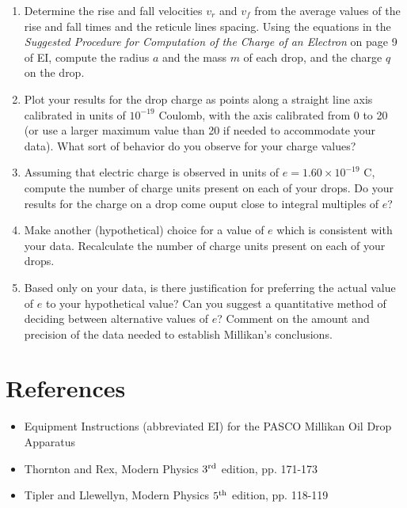 \begin{enumerate}
\item Determine the rise and fall velocities
$v_r$ and $v_f$ from the average values of the
rise and fall times and the reticule lines spacing. Using the equations
in the {\em Suggested Procedure for Computation of
the Charge of an Electron} on page 9 of EI,
compute the radius $a$ and the mass $m$ of each drop, and the charge $q$ on
the drop. 


\item Plot your results for the drop charge as points along a
straight line axis calibrated in units of
$10^{-19}$ Coulomb, with the axis
calibrated from 0 to 20 (or use a larger maximum value than 20 if
needed to accommodate your data).  What sort of behavior do you
observe for your charge values?

\item Assuming that electric charge is observed in units of $e =
1.60 \times 10^{-19}$ C, compute the
number of charge units present on each of your drops.  Do your results
for the charge on a drop come ouput close to integral multiples of $e$?

\item Make another (hypothetical) choice for a value of $e$ which is
consistent with your data.  Recalculate the number of charge units
present on each of your drops.

\item Based only on your data, is there justification for preferring the
actual value of $e$ to your hypothetical value?  Can you suggest a quantitative method of deciding
between alternative values of $e$?  Comment on the amount and precision
of the data needed to establish Millikan's
conclusions.
\end{enumerate}

\section{References}

\begin{itemize}
\item Equipment Instructions (abbreviated EI) for the PASCO Millikan Oil Drop Apparatus
\item Thornton and Rex, Modern Physics $3^{\rm rd}$ edition, pp. 171-173
\item Tipler and Llewellyn, Modern Physics $5^{\rm th}$ edition, pp. 118-119
\end{itemize}

